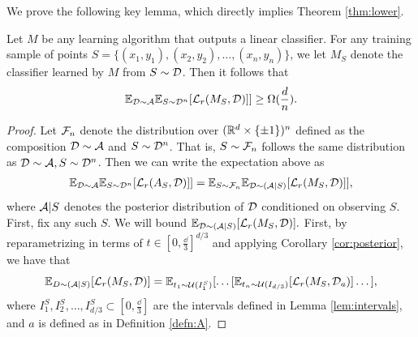 We prove the following key lemma, which directly implies Theorem \ref{thm:lower}.

\begin{lem}\label{lem:lower_bound}
Let $M$ be any learning algorithm that outputs a linear classifier. For any training sample of points $S = \{(x_1, y_1), (x_2, y_2), \dots, (x_n, y_n)\}$, we let $M_S$ denote the classifier learned by $M$ from $S \sim {\mathcal D}$. Then it follows that $$\mathbb{E}_{{\mathcal D} \sim \mathcal{A}} \mathbb{E}_{S \sim {\mathcal D}^n}[\mathcal L_r(M_S, {\mathcal D})]] \geq \Omega(\frac{d}{n}).$$ 
\end{lem}

\begin{proof}
Let ${\mathcal F}_n$ denote the distribution over $(\mathbb R^d \times \{\pm 1\})^n$ defined as the composition ${\mathcal D} \sim \mathcal{A}$ and $S \sim {\mathcal D}^n$. That is, $S \sim {\mathcal F}_n$ follows the same distribution as ${\mathcal D} \sim \mathcal{A}, S \sim {\mathcal D}^n$. Then we can write the expectation above as 
\begin{equation*}
\begin{split}
\mathbb{E}_{{\mathcal D} \sim \mathcal{A}} \mathbb{E}_{S \sim {\mathcal D}^n}[\mathcal L_r(A_S, {\mathcal D})]] = \mathbb{E}_{S \sim {\mathcal F}_n} \mathbb{E}_{{\mathcal D} \sim (\mathcal{A}|S)}[\mathcal L_r(M_S, {\mathcal D})]],
\end{split}
\end{equation*}
where $\mathcal{A}|S$ denotes the posterior distribution of ${\mathcal D}$ conditioned on observing $S$. First, fix any such $S$. We will bound $\mathbb{E}_{{\mathcal D} \sim (\mathcal{A}|S)}[\mathcal L_r(M_S, {\mathcal D})].$ First, by reparametrizing in terms of $t \in [0,\frac{\dd}{3}]^{d/3}$ and applying Corollary \ref{cor:posterior}, we have that $$\mathbb{E}_{D \sim (\mathcal{A}|S)}[\mathcal L_r(M_S, {\mathcal D})] = \mathbb{E}_{t_1 \sim {\mathcal U}(I_1^S)}[\dots [\mathbb{E}_{t_n \sim {\mathcal U}(I_{d/3})}[\mathcal L_r(M_S, {\mathcal D}_a)]\dots ],$$ where $I_1^S, I_2^S, \dots, I_{d/3}^S \subset [0, \frac{\dd}{3}]$ are the intervals defined in Lemma \ref{lem:intervals}, and $a$ is defined as in Definition \ref{defn:A}. 


\end{proof}

